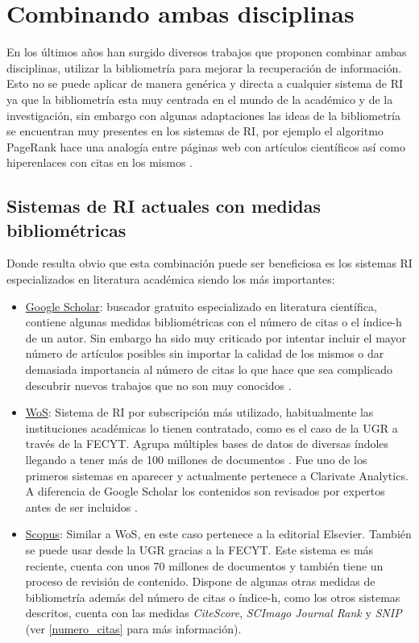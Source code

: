 \section{Combinando ambas disciplinas}

En los últimos años han surgido diversos trabajos que proponen combinar ambas disciplinas, utilizar la bibliometría para mejorar la recuperación de información. Esto no se puede aplicar de manera genérica y directa a cualquier sistema de \acrshort{RI} ya que la bibliometría esta muy centrada en el mundo de la académico y de la investigación, sin embargo con algunas adaptaciones las ideas de la bibliometría se encuentran muy presentes en los sistemas de \acrshort{RI}, por ejemplo el algoritmo PageRank hace una analogía entre páginas web con artículos científicos así como hiperenlaces con citas en los mismos \cite{PageRankPaper}. 

\subsection{Sistemas de \acrshort{RI} actuales con medidas bibliométricas}
\label{subsec:sistemasRI}
Donde resulta obvio que esta combinación puede ser beneficiosa es los sistemas \acrshort{RI} especializados en literatura académica siendo los más importantes:

\begin{itemize}
	\item \href{https://scholar.google.es/}{Google Scholar}: buscador gratuito especializado en literatura científica, contiene algunas medidas bibliométricas con el número de citas o el índice-h de un autor. Sin embargo ha sido muy criticado por intentar incluir el mayor número de artículos posibles sin importar la calidad de los mismos \cite{googleScholarJunk} o dar demasiada importancia al número de citas lo que hace que sea complicado descubrir nuevos trabajos que no son muy conocidos \cite{Beel09}.
	
	\item \href{http://wos.fecyt.es/}{\acrfull{WoS}}: Sistema de RI por subscripción más utilizado, habitualmente las instituciones académicas lo tienen contratado, como es el caso de la \acrlong{UGR} a través de la \acrfull{FECYT}. Agrupa múltiples bases de datos de diversas índoles llegando a tener más de 100 millones de documentos \cite{WoS_Facts}. Fue uno de los primeros sistemas en aparecer y actualmente pertenece a Clarivate Analytics. A diferencia de Google Scholar los contenidos son revisados por expertos antes de ser incluidos \cite{WoS_Facts}. 
	
	\item \href{https://www.scopus.com/}{Scopus}: Similar a \acrshort{WoS}, en este caso pertenece a la editorial Elsevier. También se puede usar desde la \acrshort{UGR} gracias a la \acrshort{FECYT}. Este sistema es más reciente, cuenta con unos 70 millones de documentos \cite{scopus} y también tiene un proceso de revisión de contenido. Dispone de algunas otras medidas de bibliometría además del número de citas o índice-h, como los otros sistemas descritos, cuenta con las medidas \textit{CiteScore}, \textit{SCImago Journal Rank} y \textit{SNIP} (ver \ref{numero_citas} para más información). 
\end{itemize}

